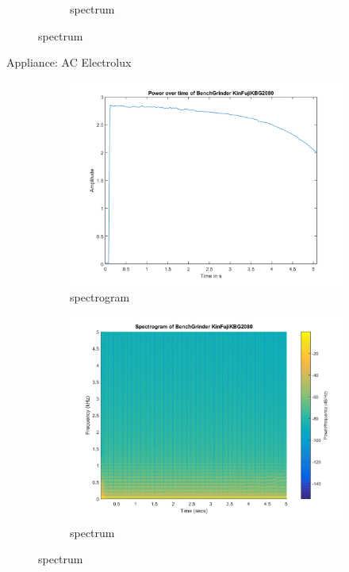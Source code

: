 \documentclass[portrait,a0b,posterdraft]{a0poster}
\begin{document}
\begin{figure}
\begin{subfigure}{.1\textwidth}
\caption{spectrum}
\end{subfigure}
\end{figure}

%
{
Appliance: AC Electrolux
\begin{figure}
\begin{subfigure}{.1\textwidth}
\centering
\includegraphics[width=\linewidth]{BenchGrinder_KinFujiKBG2080_powerTimeDomain.png}
\caption{spectrogram}
\end{subfigure}
\begin{subfigure}{.1\textwidth}
\centering
\includegraphics[width=\linewidth]{BenchGrinder_KinFujiKBG2080_spectrogram.png}
\caption{spectrum}
\end{subfigure}

\end{figure}}
\end{document}
